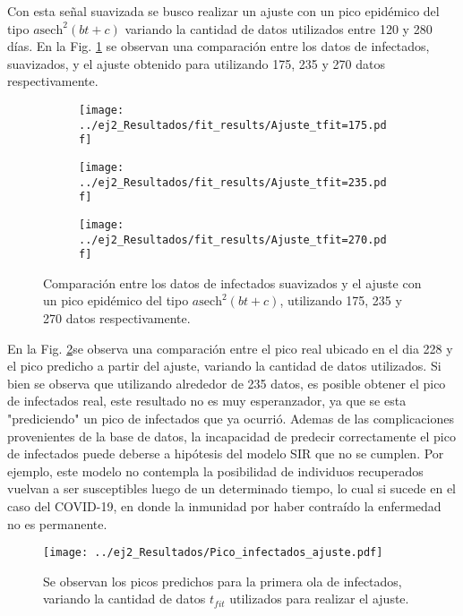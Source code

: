 Con esta señal suavizada se busco realizar un ajuste con un pico epidémico del tipo $a \text{sech}^2 \left(bt +c\right)$ variando la cantidad de datos utilizados entre 120 y 280 días. En la Fig. \ref{ej2:Ajuste_tfit} se observan una comparación entre los datos de infectados, suavizados, y el ajuste obtenido para utilizando 175, 235 y 270 datos respectivamente.

\begin{figure}[htb!]
    \centering
    \begin{subfigure}[b]{0.48\textwidth}
        \texttt{[image: ../ej2\_Resultados/fit\_results/Ajuste\_tfit=175.pdf]}
    \end{subfigure}
    \hfill
    \begin{subfigure}[b]{0.48\textwidth}
        \texttt{[image: ../ej2\_Resultados/fit\_results/Ajuste\_tfit=235.pdf]}
    \end{subfigure}
    \begin{subfigure}[b]{0.48\textwidth}
        \texttt{[image: ../ej2\_Resultados/fit\_results/Ajuste\_tfit=270.pdf]}
    \end{subfigure}
    \caption{Comparación entre los datos de infectados suavizados y el ajuste con un pico epidémico del tipo $a \text{sech}^2 \left(bt +c\right)$, utilizando 175, 235 y 270 datos respectivamente.}
    \label{ej2:Ajuste_tfit}
\end{figure}

En la Fig. \ref{ej2:Pico_infectados_ajuste}se observa una comparación entre el pico real ubicado en el dia 228 y el pico predicho a partir del ajuste, variando la cantidad de datos utilizados. Si bien se observa que utilizando alrededor de 235 datos, es posible obtener el pico de infectados real, este resultado no es muy esperanzador, ya que se esta "prediciendo" un pico de infectados que ya ocurrió. Ademas de las complicaciones provenientes de la base de datos, la incapacidad de predecir correctamente el pico de infectados puede deberse a hipótesis del modelo SIR que no se cumplen. Por ejemplo, este modelo no contempla la posibilidad de individuos recuperados vuelvan a ser susceptibles luego de un determinado tiempo, lo cual si sucede en el caso del COVID-19, en donde la inmunidad por haber contraído la enfermedad no es permanente.

\begin{figure}[htb!]
    \centering
    \texttt{[image: ../ej2\_Resultados/Pico\_infectados\_ajuste.pdf]}
    \caption{Se observan los picos predichos para la primera ola de infectados, variando la cantidad de datos $t_{fit}$ utilizados para realizar el ajuste.}
    \label{ej2:Pico_infectados_ajuste}
\end{figure}

 